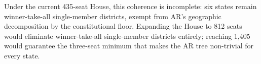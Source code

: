 Under the current 435-seat House, this coherence is incomplete: six states
remain winner-take-all single-member districts, exempt from AR's
geographic decomposition by the constitutional floor.
Expanding the House to 812 seats would eliminate winner-take-all single-member
districts entirely; reaching 1{,}405 would guarantee the three-seat minimum
that makes the AR tree non-trivial for every state.
